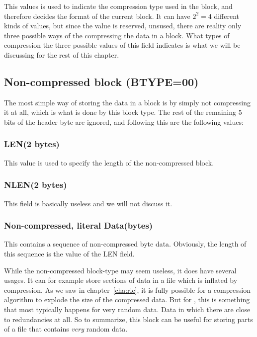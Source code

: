 This values is used to indicate the compression type used in the
block, and therefore decides the format of the current block. It can
have $2^2 = 4$ different kinds of values, but since the value 
is reserved, unsused, there are reality only three possible ways of
the compressing the data in a block. What types of compression the
three possible values of this field indicates is what we will be
discussing for the rest of this chapter.

\subsection{Non-compressed block (BTYPE=00)}

The most simple way of storing the data in a block is by simply not
compressing it at all, which is what is done by this block type. The
rest of the remaining 5 bits of the header byte are ignored, and
following this are the following values:

\subsubsection{LEN(2 bytes)}

This value is used to specify the length of the non-compressed block.

\subsubsection{NLEN(2 bytes)}

This field is basically useless and we will not discuss it.

\subsubsection{Non-compressed, literal Data(bytes)}

This contains a sequence of non-compressed byte data. Obviously, the
length of this sequence is the value of the LEN field.

While the non-compressed block-type may seem useless, it does have
several usages. It can for example store sections of data in a file
which is inflated by compression. As we saw in chapter~\ref{cha:rle},
it is fully possible for a compression algorithm to explode the size
of the compressed data. But for , this is something that most
typically happens for very random data. Data in which there are close
to redundancies at all. So to summarize, this block can be useful for
storing parts of a file that contains \textit{very} random data.


